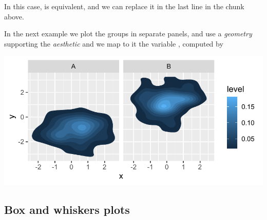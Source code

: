 \documentclass[krantz2]{krantz}\usepackage{knitr}
\begin{document}
In this case,  is equivalent, and we can replace it in the last line in the chunk above.

\begin{knitrout}\footnotesize
{}\color{fgcolor}\begin{kframe}
\begin{alltt}
  \hlstd{()}
\end{alltt}
\end{kframe}
\end{knitrout}

In the next example we plot the groups in separate panels, and use a \emph{geometry} supporting the  \emph{aesthetic} and we map to it the variable , computed by 



\begin{knitrout}\footnotesize
{}\color{fgcolor}\begin{kframe}
\begin{alltt}
  \hlopt{+}
\hlstd{(}\hlstd{(} \hlstd{=}   \hlstd{=} \hlstd{)} \hlopt{+}
  \hlstd{(}\hlopt{~}
\end{alltt}
\end{kframe}

{\centering \includegraphics[width=.7\textwidth]{figure/pos-density-plot-12-1} 

}


\end{knitrout}



\subsection{Box and whiskers plots}\label{sec:boxplot}
\end{document}

